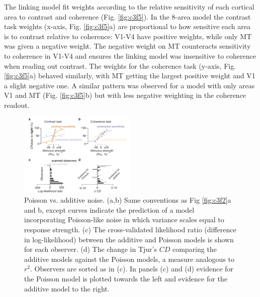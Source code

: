 The linking model fit weights according to the relative sensitivity of each cortical area to contrast and coherence (Fig. \ref{fig:c3f5}). In the 8-area model the contrast task weights (x-axis, Fig. \ref{fig:c3f5}a) are proportional to how sensitive each area is to contrast relative to coherence: V1-V4 have positive weights, while only MT was given a negative weight. The negative weight on MT counteracts sensitivity to coherence in V1-V4 and ensures the linking model was insensitive to coherence when reading out contrast. The weights for the coherence task (y-axis, Fig. \ref{fig:c3f5}a) behaved similarly, with MT getting the largest positive weight and V1 a slight negative one. A similar pattern was observed for a model with only areas V1 and MT (Fig. \ref{fig:c3f5}b) but with less negative weighting in the coherence readout.  

\begin{figure}
\centering
\includegraphics[keepaspectratio,width=0.5\textwidth]{figs_c3/Fig6_poisson.pdf}
\caption[Poisson vs. additive noise]{Poisson vs. additive noise. (a,b) Same conventions as Fig \ref{fig:c3f2}a and b, except curves indicate the prediction of a model incorporating Poisson-like noise in which variance scales equal to response strength. (c) The cross-validated likelihood ratio (difference in log-likelihood) between the additive and Poisson models is shown for each observer. (d) The change in Tjur’s $CD$ comparing the additive models against the Poisson models, a measure analogous to $r^2$. Observers are sorted as in (c). In panels (c) and (d) evidence for the Poisson model is plotted towards the left and evidence for the additive model to the right.}
\label{fig:c3f6}
\end{figure}

